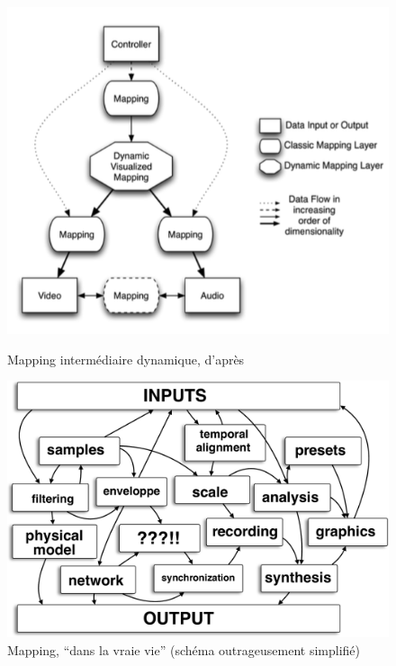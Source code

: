 \begin{figure}[!htbp]
	\captionsetup{format=plain}%
	\centering
	\begin{minipage}[t]{0.48\textwidth}
	 	\includegraphics[width=\linewidth]{gfx/04_algorithms/Momeni-DynamicMappingLayers.png}
		\caption[Représentation du mapping \#3]{Mapping intermédiaire dynamique, d'après \cite{momeni_dynamic_2006}}
		\label{fig:algorithms:DynamicMappingLayer3}
	\end{minipage}
	\hspace{.02\linewidth}
	\begin{minipage}[t]{0.48\textwidth}
	  \includegraphics[width=\linewidth]{gfx/04_algorithms/mapping-IRL.pdf}
		\caption[Représentation du mapping \#4]{Mapping, ``dans la vraie vie'' (schéma outrageusement simplifié)}
		\label{fig:algorithms:DynamicMappingLayer4}
	\end{minipage}
\end{figure}


